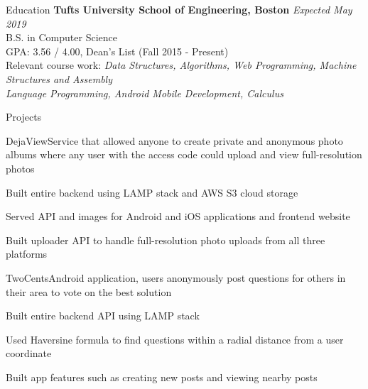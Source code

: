 \documentclass{resume}
\begin{document}
  \begin{rSection}{Education}
    {\bf Tufts University School of Engineering, Boston} \hfill {\em Expected May 2019} \\ 
    { B.S. in Computer Science} \\
    GPA: 3.56 / 4.00, Dean's List (Fall 2015 - Present)\\
    Relevant course work: \textit{Data Structures, Algorithms, Web Programming, Machine Structures and Assembly\\ Language Programming, Android Mobile Development, Calculus}
  \end{rSection}
  
  \begin{rSection}{Projects}
  
  \begin{rSubsection}{DejaView}{}{\normalfont Service that allowed anyone to create private and anonymous photo albums where any user with the access code could upload and view full-resolution photos}{}
  \item Built entire backend using LAMP stack and AWS S3 cloud storage
  \item Served API and images for Android and iOS applications and frontend website
  \item Built uploader API to handle full-resolution photo uploads from all three platforms
  \end{rSubsection}
  
  \begin{rSubsection}{TwoCents}{}{\normalfont Android application, users anonymously post questions for others in their area to vote on the best solution}{}
    \item Built entire backend API using LAMP stack  
    \item Used Haversine formula to find questions within a radial distance from a user coordinate
    \item Built app features such as creating new posts and viewing nearby posts
  \end{rSubsection}
   
  \end{rSection}
  
\end{document}
